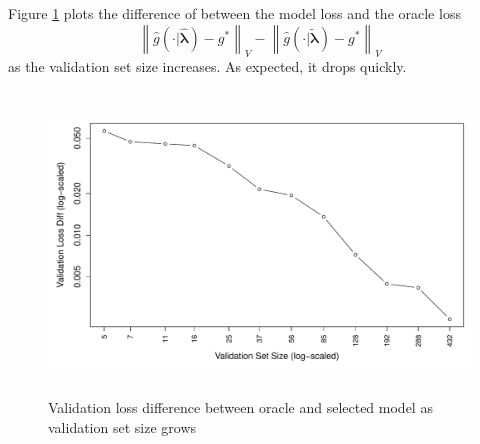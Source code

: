\documentclass[12pt]{article}
\begin{document}
Figure \ref{fig:emp_v_theory} plots the difference of between the model loss and the oracle loss
$$
\left \| \hat{g}(\cdot | \hat{\boldsymbol{\lambda}}) - g^* \right \|_V - 
\left \| \hat{g}(\cdot | \tilde{\boldsymbol{\lambda}}) - g^* \right \|_V
$$
as the validation set size increases. As expected, it drops quickly.


\begin{figure}
\label{fig:emp_v_theory}
\caption{
	Validation loss difference between oracle and selected model as validation set size grows
}
\centering
\includegraphics[height=80mm]{../R/figures/validation_size_loss_diff.pdf}
\end{figure}
\end{document}

